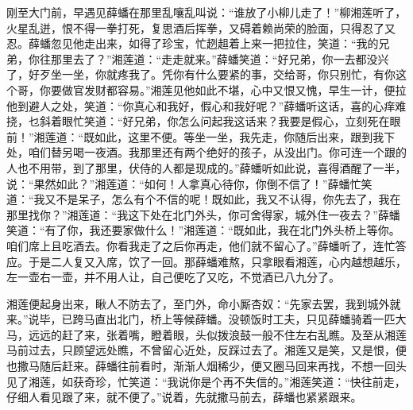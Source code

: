 刚至大门前，早遇见薛蟠在那里乱嚷乱叫说：``谁放了小柳儿走了！''柳湘莲听了，火星乱迸，恨不得一拳打死，复思酒后挥拳，又碍着赖尚荣的脸面，只得忍了又忍。薛蟠忽见他走出来，如得了珍宝，忙趔趄着上来一把拉住，笑道：``我的兄弟，你往那里去了？''湘莲道：``走走就来。''薛蟠笑道：``好兄弟，你一去都没兴了，好歹坐一坐，你就疼我了。凭你有什么要紧的事，交给哥，你只别忙，有你这个哥，你要做官发财都容易。''湘莲见他如此不堪，心中又恨又愧，早生一计，便拉他到避人之处，笑道：``你真心和我好，假心和我好呢？''薛蟠听这话，喜的心痒难挠，乜斜着眼忙笑道：``好兄弟，你怎么问起我这话来？我要是假心，立刻死在眼前！''湘莲道：``既如此，这里不便。等坐一坐，我先走，你随后出来，跟到我下处，咱们替另喝一夜酒。我那里还有两个绝好的孩子，从没出门。你可连一个跟的人也不用带，到了那里，伏侍的人都是现成的。''薛蟠听如此说，喜得酒醒了一半，说：``果然如此？''湘莲道：``如何！人拿真心待你，你倒不信了！''薛蟠忙笑道：``我又不是呆子，怎么有个不信的呢！既如此，我又不认得，你先去了，我在那里找你？''湘莲道：``我这下处在北门外头，你可舍得家，城外住一夜去？''薛蟠笑道：``有了你，我还要家做什么！''湘莲道：``既如此，我在北门外头桥上等你。咱们席上且吃酒去。你看我走了之后你再走，他们就不留心了。''薛蟠听了，连忙答应。于是二人复又入席，饮了一回。那薛蟠难熬，只拿眼看湘莲，心内越想越乐，左一壶右一壶，并不用人让，自己便吃了又吃，不觉酒已八九分了。

湘莲便起身出来，瞅人不防去了，至门外，命小厮杏奴：``先家去罢，我到城外就来。''说毕，已跨马直出北门，桥上等候薛蟠。没顿饭时工夫，只见薛蟠骑着一匹大马，远远的赶了来，张着嘴，瞪着眼，头似拨浪鼓一般不住左右乱瞧。及至从湘莲马前过去，只顾望远处瞧，不曾留心近处，反踩过去了。湘莲又是笑，又是恨，便也撒马随后赶来。薛蟠往前看时，渐渐人烟稀少，便又圈马回来再找，不想一回头见了湘莲，如获奇珍，忙笑道：``我说你是个再不失信的。''湘莲笑道：``快往前走，仔细人看见跟了来，就不便了。''说着，先就撒马前去，薛蟠也紧紧跟来。


